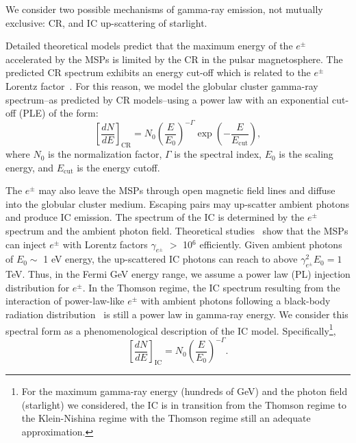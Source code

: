 \documentclass[doublespace,nopageskip]{VTthesis}
\begin{document}
We consider two possible mechanisms of gamma-ray emission, not mutually exclusive: CR, and IC up-scattering of starlight.

Detailed theoretical models predict that the maximum energy of the $e^\pm$ accelerated by the MSPs is limited by the CR in the pulsar magnetosphere. The predicted CR spectrum exhibits an energy cut-off which is related to the $e^\pm$ Lorentz factor~\citep{2005ApJ...622..531H}. For this reason, we model the globular cluster gamma-ray spectrum--as predicted by CR models--using a power law with an exponential cut-off (PLE) of the form:
\begin{equation}\label{eq:PLE}
    \left[ \frac{dN}{dE} \right]_{\mathrm{CR}} = N_0 \left(\frac{E}{E_0} \right)^{-\Gamma}\exp{ \left( -\frac{E}{E_\text{cut}} \right) },
\end{equation}
where $N_0$ is the normalization factor, $\Gamma$ is the spectral index, $E_0$ is the scaling energy, and $E_\mathrm{cut}$ is the energy cutoff. 

The $e^\pm$ may also leave the MSPs through open magnetic field lines and diffuse into the globular cluster medium. Escaping pairs may up-scatter ambient photons and produce IC emission. The spectrum of the IC is determined by the $e^\pm$ spectrum and the ambient photon field. Theoretical studies~\citep{2011ApJ...743..181H} show that the MSPs can inject $e^\pm$ with Lorentz factors $\gamma_{e^\pm}$ $>$ 10$^6$ efficiently. Given ambient photons of $ E_0\sim$ 1 eV energy, the up-scattered IC photons can reach to above $\gamma_{e^\pm}^2 E_0 = 1$ TeV. Thus, in the Fermi GeV energy range, we assume a power law (PL) injection distribution for $e^\pm$. In the Thomson regime, the IC spectrum resulting from the interaction of power-law-like $e^\pm$ with ambient photons following a black-body radiation distribution~\citep{1970RvMP...42..237B} is still a power law in gamma-ray energy. We consider this spectral form as a phenomenological description of the IC model. Specifically\footnote{For the maximum gamma-ray energy (hundreds of GeV) and the photon field (starlight) we considered, the IC is in transition from the Thomson regime to the Klein-Nishina regime with the Thomson regime still an adequate approximation.},
\begin{equation}\label{eq:PL}
    \left[ \frac{dN}{dE} \right]_{\mathrm{IC}} = N_0 \left(\frac{E}{E_0} \right)^{-\Gamma}.
\end{equation}
\end{document}
